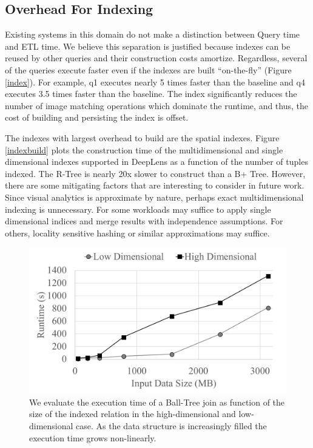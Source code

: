 \subsection{Overhead For Indexing}
Existing systems in this domain do not make a distinction between Query time and ETL time.
We believe this separation is justified because indexes can be reused by other queries and their construction costs amortize.
Regardless, several of the queries execute faster even if the indexes are built ``on-the-fly'' (Figure \ref{index}).
For example, q1 executes nearly 5 times faster than the baseline and q4 executes 3.5 times faster than the baseline.
The index significantly reduces the number of image matching operations which dominate the runtime, and thus, the cost of building and persisting the index is offset.

The indexes with largest overhead to build are the spatial indexes.
Figure \ref{indexbuild} plots the construction time of the multidimensional and single dimensional indexes supported in \textsf{DeepLens} as a function of the number of tuples indexed.
The R-Tree is nearly 20x slower to construct than a B+ Tree.
However, there are some mitigating factors that are interesting to consider in future work.
Since visual analytics is approximate by nature, perhaps exact multidimensional indexing is unnecessary. 
For some workloads may suffice to apply single dimensional indices and merge results with independence assumptions.
For others, locality sensitive hashing or similar approximations may suffice.

\begin{figure}[t]
\centering
 \includegraphics[width=\columnwidth]{figures/spatialjoin.png}
 \caption{We evaluate the execution time of a Ball-Tree join as function of the size of the indexed relation in the high-dimensional and low-dimensional case. As the data structure is increasingly filled the execution time grows non-linearly.  \label{join} }
\end{figure}


